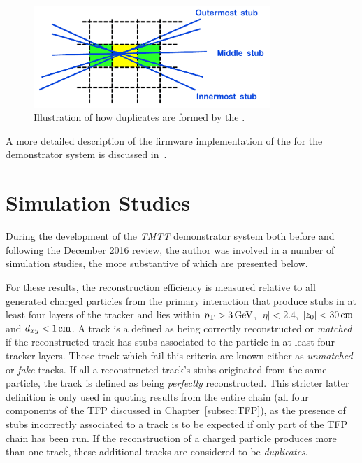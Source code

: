 \begin{figure}[!h]
\centering
\includegraphics[width=0.80\textwidth]{figs/tk-upgrade/A50_algo.pdf}
\caption{Illustration of how duplicates are formed by the \rphi \HT.}
\label{fig:DR}
\end{figure}

A more detailed description of the firmware implementation of the \DR for the demonstrator system is discussed in~\cite{TMTT_JINST}.

\section{Simulation Studies}\label{sec:TmttSimStudies}

During the development of the \emph{TMTT} demonstrator system both before and following the December 2016 review, the author was involved in a number of simulation studies, the more substantive of which are presented below.

For these results, the reconstruction efficiency is measured relative to all generated charged particles from the primary interaction that produce stubs in at least four layers of the tracker and lies within $p_{\mathrm{T}} > 3\,\text{Ge\hspace{-.08em}V}$, $|\eta| < 2.4$, $|z_{0}| < 30\,\text{cm}$ and $d_{xy} < 1\,\text{cm}$.
A track is a defined as being correctly reconstructed or \emph{matched} if the reconstructed track has stubs associated to the particle in at least four tracker layers.
Those track which fail this criteria are known either as \emph{unmatched} or \emph{fake} tracks.
If all a reconstructed track's stubs originated from the same particle, the track is defined as being \emph{perfectly} reconstructed.
This stricter latter definition is only used in quoting results from the entire chain (\ie all four components of the TFP discussed in Chapter~\ref{subsec:TFP}), as the presence of stubs incorrectly associated to a track is to be expected if only part of the TFP chain has been run.
If the reconstruction of a charged particle produces more than one track, these additional tracks are considered to be \emph{duplicates}.

